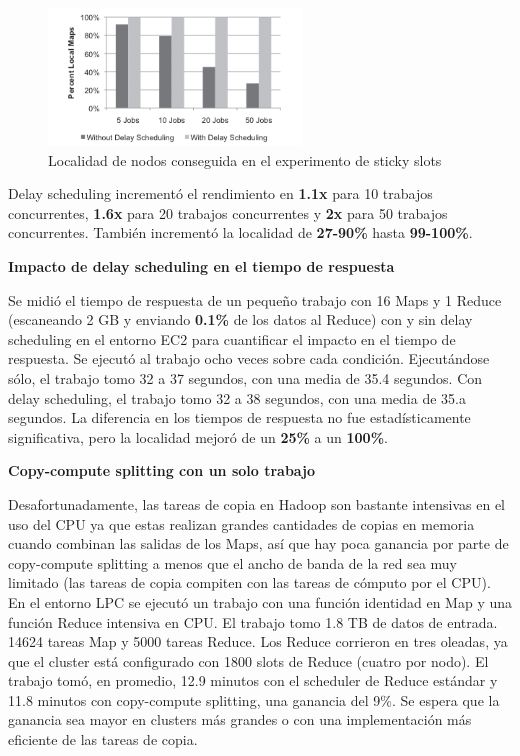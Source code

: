 \begin{figure}[H]
\begin{center}
\includegraphics[width=0.6\textwidth]{img/img8.png}
     \caption{Localidad de nodos conseguida en el experimento de sticky slots}
\end{center}
\end{figure}

Delay scheduling incrementó el rendimiento en \textbf{1.1x} para 10 trabajos concurrentes, \textbf{1.6x} para 20 trabajos concurrentes y \textbf{2x} para 50 trabajos concurrentes. También incrementó la localidad de \textbf{27-90\%} hasta \textbf{99-100\%}.\\


\begin{center}
	\textbf{Impacto de delay scheduling en el tiempo de respuesta}
\end{center}

Se midió el tiempo de respuesta de un pequeño trabajo con 16 Maps y 1 Reduce (escaneando 2 GB y enviando \textbf{0.1\%} de los datos al Reduce) con y sin delay scheduling en el entorno EC2 para cuantificar el impacto en el tiempo de respuesta. Se ejecutó al trabajo ocho veces sobre cada condición. Ejecutándose sólo, el trabajo tomo 32 a 37 segundos, con una media de 35.4 segundos. Con delay scheduling, el trabajo tomo 32 a 38 segundos, con una media de 35.a segundos. La diferencia en los tiempos de respuesta no fue estadísticamente significativa, pero la localidad mejoró de un \textbf{25\%} a un \textbf{100\%}.\\


\begin{center}
	\textbf{Copy-compute splitting con un solo trabajo}
\end{center}

Desafortunadamente, las tareas de copia en Hadoop son bastante intensivas en el uso del CPU ya que estas realizan grandes cantidades de copias en memoria cuando combinan las salidas de los Maps, así que hay poca ganancia por parte de copy-compute splitting a menos que el ancho de banda de la red sea muy limitado (las tareas de copia compiten con las tareas de cómputo por el CPU). En el entorno LPC se ejecutó un trabajo con una función identidad en Map y una función Reduce intensiva en CPU. El trabajo tomo 1.8 TB de datos de entrada. 14624 tareas Map y 5000 tareas Reduce. Los Reduce corrieron en tres oleadas, ya que el cluster está configurado con 1800 slots de Reduce (cuatro por nodo). El trabajo tomó, en promedio, 12.9 minutos con el scheduler de Reduce estándar y 11.8 minutos con copy-compute splitting, una ganancia del 9\%. Se espera que la ganancia sea mayor en clusters más grandes o con una implementación más eficiente de las tareas de copia.\\


